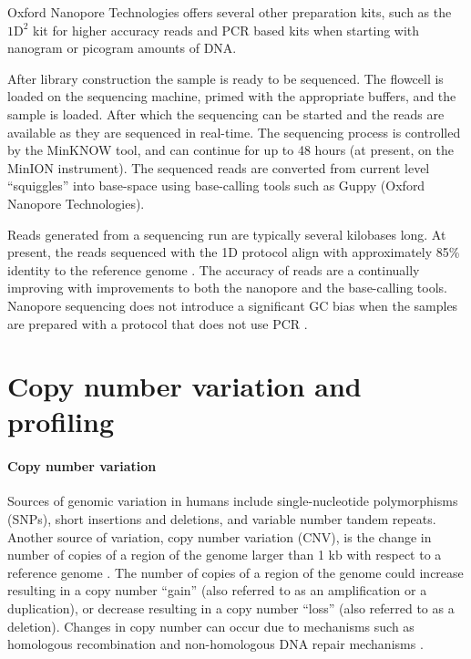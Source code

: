 Oxford Nanopore Technologies offers several other preparation kits, such
as the $\text{1D}^2$ kit for higher accuracy reads and PCR based kits when
starting with nanogram or picogram amounts of DNA.

After library construction the sample is ready to be sequenced. The
flowcell is loaded on the sequencing machine, primed with the appropriate
buffers, and the sample is loaded. After which the sequencing can be
started and the reads are available as they are sequenced in real-time.
%
The sequencing process is controlled by the MinKNOW tool, and can
continue for up to 48 hours (at present, on the MinION instrument).
The sequenced reads are converted from current level ``squiggles'' into
base-space using base-calling tools such as Guppy (Oxford Nanopore
Technologies).

Reads generated from a sequencing run are typically several kilobases
long.
At present, the reads sequenced with the 1D protocol align with
approximately 85\% identity to the reference genome
\citep{bowden2019sequencing,jain2018nanopore,carter2017robust}.  The
accuracy of reads are a continually improving with improvements to both
the nanopore and the base-calling tools.
Nanopore sequencing does not introduce a significant GC bias when the
samples are prepared with a protocol that does not use PCR
\citep{carter2017robust}.


\section{Copy number variation and profiling}
\paragraph{Copy number variation}
Sources of genomic variation in humans include single-nucleotide
polymorphisms (SNPs), short insertions and deletions, and variable
number tandem repeats.
Another source of variation, copy number variation (CNV), is the change
in number of copies of a region of the genome larger than 1 kb with
respect to a reference genome
\citep{redon2006global,feuk2006structural}.  The number of copies of a
region of the genome could increase resulting in a copy number ``gain''
(also referred to as an amplification or a duplication), or decrease
resulting in a copy number ``loss'' (also referred to as a deletion).
Changes in copy number can occur due to mechanisms such as homologous
recombination and non-homologous DNA repair mechanisms
\citep{hastings2009mechanisms,van2011origins,stankiewicz2010structural}.

